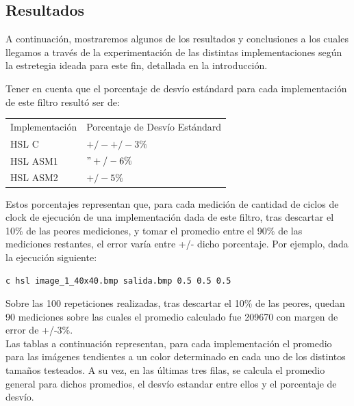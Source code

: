 \subsection{Resultados}
A continuación, mostraremos algunos de los resultados y conclusiones a los cuales llegamos a través de la experimentación de las distintas implementaciones según la estretegia ideada para este fin, detallada en la introducción.

Tener en cuenta que el porcentaje de desvío estándard para cada implementación de este filtro resultó ser de:
\begin{tabular}{| l | l |}
\hline
Implementación & Porcentaje de Desvío Estándard \\
HSL C	& $+/- +/- 3\%$\\
HSL ASM1 & 	$"+/- 6\%$\\
HSL ASM2	& $+/- 5\%$\\
\hline
\end{tabular}

Estos porcentajes representan que, para cada medición de cantidad de ciclos de clock de ejecución de una implementación dada de este filtro, tras descartar el 10\% de las peores mediciones, y tomar el promedio entre el 90\% de las mediciones restantes, el error varía entre +/- dicho porcentaje. Por ejemplo, dada la ejecución siguiente:

\begin{verbatim}
c hsl image_1_40x40.bmp salida.bmp 0.5 0.5 0.5
\end{verbatim}
Sobre las 100 repeticiones realizadas, tras descartar el 10\% de las peores, quedan 90 mediciones sobre las cuales el promedio calculado fue 209670 con margen de error de +/-3\%.\\

Las tablas a continuación representan, para cada implementación el promedio para las imágenes tendientes a un color determinado en cada uno de los distintos tamaños testeados. A su vez, en las últimas tres filas, se calcula el promedio general para dichos promedios, el desvío estandar entre ellos y el porcentaje de desvío.

